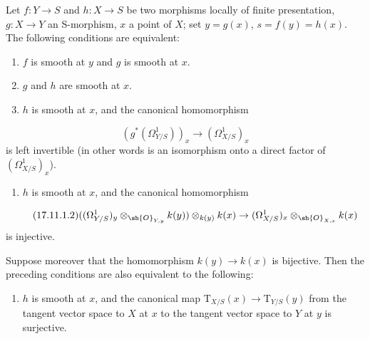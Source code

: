 \begin{theorem}[17.11.1]
\label{IV.17.11.1}
Let $f:Y\to S$ and $h:X\to S$ be two morphisms locally of finite presentation, $g:X\to Y$ an S-morphism, $x$ a point of $X$; set $y=g(x)$, $s=f(y)=h(x)$.
The following conditions are equivalent:
\begin{enumerate}
  \item[a)] $f$ is smooth at $y$ and $g$ is smooth at $x$.
  \item[b)] $g$ and $h$ are smooth at $x$.
  \item[c)] $h$ is smooth at $x$, and the canonical homomorphism 
\end{enumerate}
\begin{equation}
\label{IV.17.11.1.1}
\tag{17.11.1.1}
  (g^*(\Omega^1_{Y/S}))_x \to (\Omega^1_{X/S})_x
\end{equation}
is left invertible (in other words is an isomorphism onto a direct factor of $(\Omega^1_{X/S})_x$).
\begin{enumerate}
  \item[c')] $h$ is smooth at $x$, and the canonical homomorphism
\end{enumerate}
\begin{equation}
\label{IV.17.11.1.2}
\tag{17.11.1.2}
  ((\Omega^1_{Y/S})_y\otimes_{\sh{O}_{Y,y}} k(y))\otimes_{k(y)} k(x) \to (\Omega^1_{X/S})_x\otimes_{\sh{O}_{X,x}} k(x)
\end{equation}
is injective.

Suppose moreover that the homomorphism $k(y)\to k(x)$ is bijective.
Then the preceding conditions are also equivalent to the following:


\begin{enumerate}
  \item[d)] $h$ is smooth at $x$, and the canonical map
  $\mathrm{T}_{X/S}(x)\to\mathrm{T}_{Y/S}(y)$ 
  from the tangent vector space to $X$ at $x$ to the tangent vector space to $Y$ at $y$ is surjective.
\end{enumerate}
\end{theorem}

